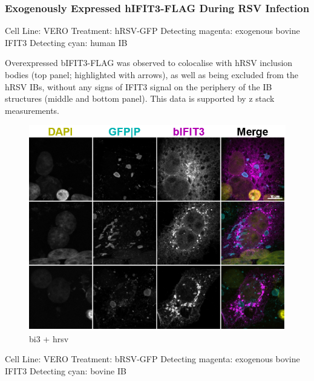 \subsubsection{Exogenously Expressed hIFIT3-FLAG During RSV Infection} \label{Exogenously Expressed hIFIT3-FLAG During RSV Infection}
Cell Line: VERO \newline
Treatment: hRSV-GFP \newline
Detecting magenta: exogenous bovine IFIT3 \newline
Detecting cyan: human IB \newline

Overexpressed bIFIT3-FLAG was observed to colocalise with hRSV inclusion bodies (top panel; highlighted with arrows), as well as being excluded from the hRSV IBs, without any signs of IFIT3 signal on the periphery of the IB structures (middle and bottom panel). This data is supported by z stack measurements.

\begin{figure}
    \centering
    \includegraphics[width=1\linewidth]{08. Chapter 3/Figs/04. IFIT3/05. bi3 hrsv.png}
    \caption[bi3 + hrsv]{bi3 + hrsv}
    \label{bi3 + hrsv}
\end{figure}

Cell Line: VERO \newline
Treatment: bRSV-GFP \newline
Detecting magenta: exogenous bovine IFIT3 \newline
Detecting cyan: bovine IB \newline

